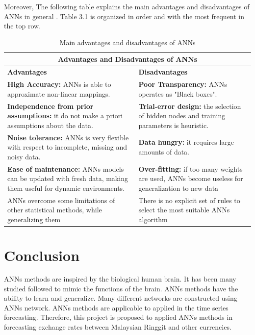 Moreover, The following table explains the main advantages and disadvantages of ANNs in general \cite{lisboa:2000}. Table 3.1 is organized  in order and with the most frequent in the top row.
\begin{table}[h!]
	\centering
	\begin{tabular}{ |p{6cm}|p{6cm}|}
		\hline
		\multicolumn {2}{|c|}{\textbf{Advantages and Disadvantages of ANNs}} \\
		\hline
		\textbf{Advantages}  & \textbf{Disadvantages} \\
		\hline
		\textbf{High Accuracy:} ANNs is able to approximate non-linear mappings. & \textbf{Poor Transparency:} ANNs operates as "Black boxes". \\
		\hline
		\textbf{Independence from prior assumptions:} it do not make a priori assumptions about the data. & \textbf{Trial-error design:} the selection of hidden nodes and training parameters is heuristic.  \\
		\hline
		\textbf{Noise tolerance:} ANNs is very flexible with respect to incomplete, missing and noisy data. & \textbf{Data hungry:} it requires large amounts of data. \\
		\hline
		\textbf{Ease of maintenance:} ANNs models can be updated with fresh data, making them useful for dynamic environments.   &  \textbf{Over-fitting:} if too many weights are used, ANNs become useless for generalization to new data \\
		\hline
		ANNs overcome some limitations of other statistical methods, while generalizing them & There is no explicit set of rules to select the most suitable ANNs algorithm  \\
		\hline
	\end{tabular}
	\caption{Main advantages and disadvantages of ANNs}
\end{table}

\pagebreak

\section{Conclusion}
ANNs methods are inspired by the biological human brain. It has been many studied followed to mimic the functions of the brain. ANNs methods have the ability to learn and generalize. Many different networks are constructed using ANNs network. ANNs methods are applicable to applied in the time series forecasting. Therefore, this project is proposed to applied ANNs methods in forecasting exchange rates between Malaysian Ringgit and other currencies.